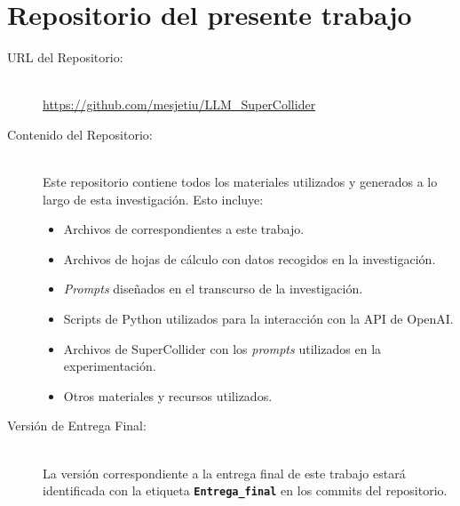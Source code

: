 \chapter{Repositorio del presente trabajo}
\label{anexo:repositorio}

\begin{center}
\end{center}

\begin{description}
    \item[URL del Repositorio:] \hfill \\
    \url{https://github.com/mesjetiu/LLM_SuperCollider}
    
    \item[Contenido del Repositorio:] \hfill \\
    Este repositorio contiene todos los materiales utilizados y generados a lo largo de esta investigación. Esto incluye:
    \begin{itemize}
        \item Archivos de  correspondientes a este trabajo.
        \item Archivos de hojas de cálculo con datos recogidos en la investigación.
        \item \emph{Prompts} diseñados en el transcurso de la investigación.
        \item Scripts de Python utilizados para la interacción con la API de OpenAI.
        \item Archivos de SuperCollider con los \emph{prompts} utilizados en la experimentación.
        \item Otros materiales y recursos utilizados.
    \end{itemize}
    
    \item[Versión de Entrega Final:] \hfill \\
    La versión correspondiente a la entrega final de este trabajo estará identificada con la etiqueta \textbf{\texttt{Entrega\_final}} en los commits del repositorio.

\end{description}



